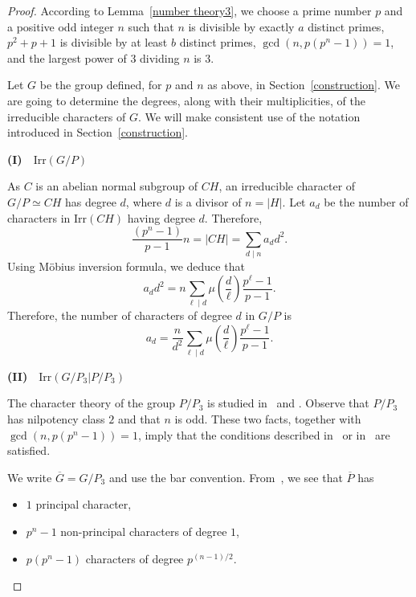 \documentclass{amsart}
\def\irr#1{\mathrm{Irr}(#1)}
\begin{document}
\begin{proof}
According to Lemma~\ref{number theory3}, we choose a prime number $p$ and a positive odd integer $n$ such that
$n$ is divisible by exactly $a$ distinct primes,  $p^2+p+1$ is divisible by at least $b$ distinct primes,
$\gcd(n,p(p^n-1))=1$, and  the largest power of $3$ dividing $n$ is $3$.

Let $G$ be the group defined, for $p$ and $n$ as above,   in  Section~\ref{construction}.
We are going to determine the degrees, along with their multiplicities, of the irreducible characters of $G$.
We will make consistent use of the notation introduced in  Section~\ref{construction}.

\medskip
{\bf (I)}~~$\irr{G/P}$

\smallskip
 As $C$ is an abelian normal subgroup of $CH$, an irreducible character of $G/P \simeq CH$ has degree $d$, where $d$ is a divisor of $n = |H|$. Let $a_d$ be the number of characters in $\mathrm{Irr}(CH)$ having degree $d$. Therefore,
$$\frac{(p^n-1)}{p-1}n=|CH|=\sum_{d\mid n}a_dd^2.$$
Using M\"{o}bius inversion formula, we deduce that $$a_dd^2=n\sum_{\ell\mid d}\mu\left(\frac{d}{\ell}\right)\frac{p^\ell-1}{p-1}.$$
Therefore, the number of characters of degree $d$ in $G/P$ is
$$a_d=\frac{n}{d^2}\sum_{\ell\mid d}\mu\left(\frac{d}{\ell}\right)\frac{p^\ell-1}{p-1}.$$


\medskip
{\bf (II)}~~$\mathrm{Irr}(G/P_3| P/P_3)$

\smallskip
The character theory of the group $P/P_3$ is studied in~\cite{HO} and \cite{11}. Observe that $P/P_3$ has nilpotency class $2$ and that $n$ is odd. These two facts, together with $\gcd(n, p(p^n -1)) = 1$,  imply that the conditions described in~\cite[page~340]{HO} or in~\cite[page~190]{11} are satisfied.

We write $\overline{G} = G/P_3$ and use the bar convention.
From~\cite[Theorem~4.4]{11}, we see that $\overline{P}$ has
\begin{itemize}
\item $1$ principal character,
\item $p^n-1$ non-principal characters of degree $1$,
\item $p(p^n-1)$ characters of degree $p^{(n-1)/2}$.
\end{itemize}


\end{proof}
\end{document}
